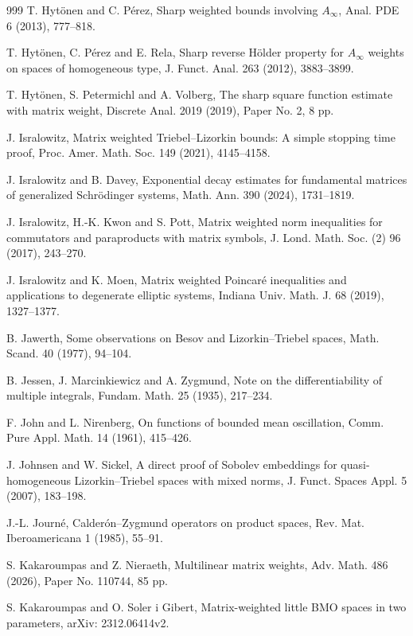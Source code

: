 \documentclass[11pt, reqno]{amsart}
\theoremstyle{definition}
\theoremstyle{remark}
\numberwithin{equation}{section}
\begin{document}
\begin{thebibliography}{999}
T. Hyt\"onen and C. P\'erez,
Sharp weighted bounds involving  $A_\infty$,
Anal. PDE 6 (2013), 777--818.

T. Hyt\"onen, C. P\'erez and E. Rela,
Sharp reverse H\"older property for $A_\infty$ weights on spaces of homogeneous type,
J. Funct. Anal. 263 (2012), 3883--3899.

T. Hyt\"onen, S. Petermichl and A. Volberg,
The sharp square function estimate with matrix weight,
Discrete Anal. 2019 (2019), Paper No. 2, 8 pp.

J. Isralowitz,
Matrix weighted Triebel--Lizorkin bounds: A simple stopping time proof,
Proc. Amer. Math. Soc. 149 (2021), 4145--4158.

J. Isralowitz and B. Davey,
Exponential decay estimates for fundamental matrices of generalized Schr\"odinger systems, Math. Ann. 390 (2024), 1731--1819.

J. Isralowitz, H.-K. Kwon and S. Pott,
Matrix weighted norm inequalities for commutators and paraproducts with matrix symbols,
J. Lond. Math. Soc. (2) 96 (2017), 243--270.

J. Isralowitz and K. Moen,
Matrix weighted Poincar\'e inequalities and applications to degenerate elliptic systems,
Indiana Univ. Math. J. 68 (2019), 1327--1377.

B. Jawerth,
Some observations on Besov and Lizorkin--Triebel spaces,
Math. Scand. 40 (1977), 94--104.

B. Jessen, J. Marcinkiewicz and A. Zygmund,
Note on the differentiability of multiple integrals,
Fundam. Math. 25 (1935), 217--234.

F. John and L. Nirenberg,
On functions of bounded mean oscillation,
Comm. Pure Appl. Math. 14 (1961), 415--426.

J. Johnsen and W. Sickel,
A direct proof of Sobolev embeddings for quasi-homogeneous
Lizorkin--Triebel spaces with mixed norms,
J. Funct. Spaces Appl. 5 (2007), 183--198.

J.-L. Journ\'e,
Calder\'on--Zygmund operators on product spaces,
Rev. Mat. Iberoamericana 1 (1985), 55--91.

S. Kakaroumpas and Z. Nieraeth,
Multilinear matrix weights,
Adv. Math. 486 (2026), Paper No. 110744, 85 pp.

S. Kakaroumpas and O. Soler i Gibert,
Matrix-weighted little BMO spaces in two parameters,
arXiv: 2312.06414v2.


\end{thebibliography}
\end{document}
